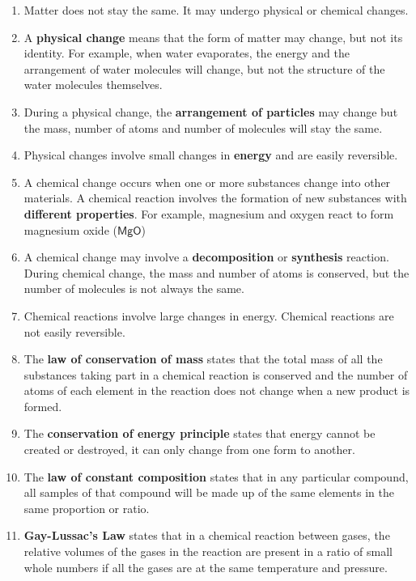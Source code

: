       \label{m38711*id65342}\begin{enumerate}[noitemsep, label=\textbf{\arabic*}. ] 
            \label{m38711*uid40}\item Matter does not stay the same. It may undergo physical or chemical changes.
\label{m38711*uid41}\item A \textbf{physical change} means that the form of matter may change, but not its identity. For example, when water evaporates, the energy and the arrangement of water molecules will change, but not the structure of the water molecules themselves.
\label{m38711*uid42}\item During a physical change, the \textbf{arrangement of particles} may change but the mass, number of atoms and number of molecules will stay the same.
\label{m38711*uid43}\item Physical changes involve small changes in \textbf{energy} and are easily reversible.
\label{m38711*uid44}\item A chemical change occurs when one or more substances change into other materials. A chemical reaction involves the formation of new substances with \textbf{different properties}. For example, magnesium and oxygen react to form magnesium oxide ($\mathsf{MgO}$) \label{m38711*uid45}\item A chemical change may involve a \textbf{decomposition} or \textbf{synthesis} reaction. During chemical change, the mass and number of atoms is conserved, but the number of molecules is not always the same.
\label{m38711*uid46}\item Chemical reactions involve large changes in energy. Chemical reactions are not easily reversible.
\label{m38711*uid48}\item The \textbf{law of conservation of mass} states that the total mass of all the substances taking part in a chemical reaction is conserved and the number of atoms of each element in the reaction does not change when a new product is formed.
\label{m38711*uid49}\item The \textbf{conservation of energy principle} states that energy cannot be created or destroyed, it can only change from one form to another.
\label{m38711*uid50}\item The \textbf{law of constant composition} states that in any particular compound, all samples of that compound will be made up of the same elements in the same proportion or ratio.
\label{m38711*uid51}\item \textbf{Gay-Lussac's Law} states that in a chemical reaction between gases, the relative volumes of the gases in the reaction are present in a ratio of small whole numbers if all the gases are at the same temperature and pressure.
\end{enumerate}
